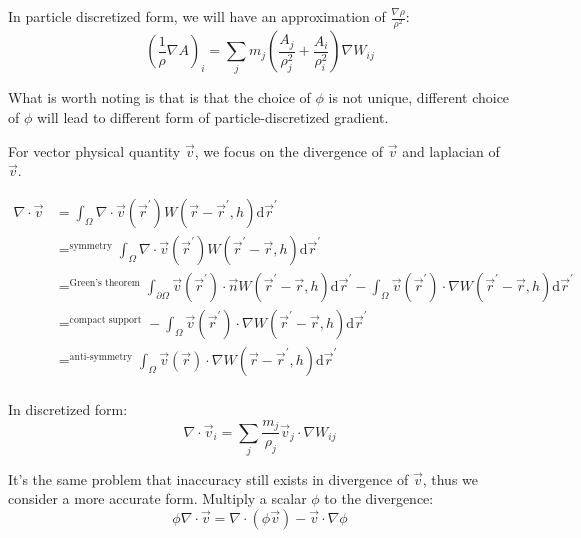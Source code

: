 In particle discretized form, we will have an approximation of $\frac{\nabla\rho}{\rho^2}$:
\begin{equation}
    \left(\frac{1}{\rho}\nabla A\right)_i
    =
    \sum_j m_j
    \left(
        \frac{A_j}{\rho_j^2}
        +
        \frac{A_i}{\rho_i^2}
    \right)\nabla W_{ij}
\end{equation}

What is worth noting is that 
is that the choice of $\phi$ is not unique, 
different choice of $\phi$ will lead to different form of particle-discretized gradient.

For vector physical quantity $\vec{v}$,
we focus on the divergence of $\vec{v}$ and laplacian of $\vec{v}$.

\begin{equation}
    \begin{aligned}
        \nabla\cdot \vec{v} &=
        \int_{\Omega} \nabla\cdot \vec{v}(\vec{r}^\prime) W(\vec{r} - \vec{r}^\prime,h)\mathrm{d}\vec{r}^\prime \\
        &\mathop{=}^{\text{symmetry}}
        \int_{\Omega} \nabla\cdot \vec{v}(\vec{r}^\prime) W(\vec{r}^\prime-\vec{r},h)\mathrm{d}\vec{r}^\prime\\
        &\mathop{=}^{\text{Green's theorem}}
        \int_{\partial\Omega} \vec{v}(\vec{r}^\prime) \cdot \vec{n} W(\vec{r}^\prime-\vec{r},h)\mathrm{d}\vec{r}^\prime
        - \int_{\Omega} \vec{v}(\vec{r}^\prime) \cdot \nabla W(\vec{r}^\prime-\vec{r},h)\mathrm{d}\vec{r}^\prime\\
        &\mathop{=}^{\text{compact support}}
        - \int_{\Omega} \vec{v}(\vec{r}^\prime) \cdot \nabla W(\vec{r}^\prime-\vec{r},h)\mathrm{d}\vec{r}^\prime\\
        &\mathop{=}^{\text{anti-symmetry}}
        \int_{\Omega} \vec{v}(\vec{r}) \cdot \nabla W(\vec{r}-\vec{r}^\prime,h)\mathrm{d}\vec{r}^\prime\\
    \end{aligned}
\end{equation}

In discretized form:
\begin{equation}
    \nabla\cdot \vec{v}_i = \sum_j \frac{m_j}{\rho_j} \vec{v}_j \cdot \nabla W_{ij}
\end{equation}

It's the same problem that inaccuracy still exists in divergence of $\vec{v}$, 
thus we consider a more accurate form.
Multiply a scalar $\phi$ to the divergence:
\begin{equation}
    \phi\nabla\cdot \vec{v} = \nabla\cdot(\phi \vec{v}) - \vec{v}\cdot\nabla\phi
\end{equation}

